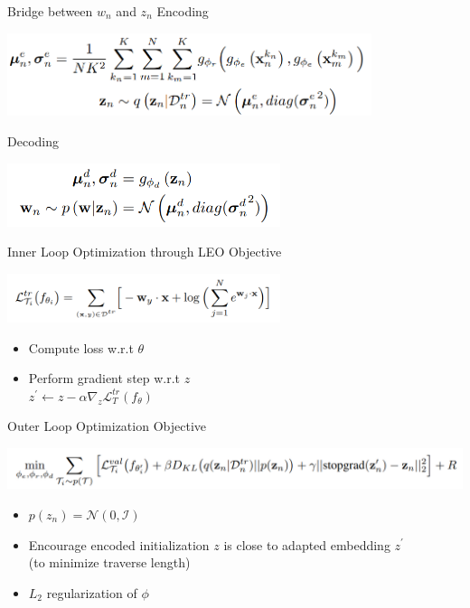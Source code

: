 \documentclass{beamer}
\begin{document}
\begin{frame}{Bridge between $w_n$ and $z_n$}
  Encoding
  \begin{center}
    \includegraphics[width=0.8\textwidth]{fig/LEO-encoding.png}
  \end{center}

  Decoding
  \begin{center}
  \includegraphics[width=0.6\textwidth]{fig/LEO-decoding.png}
  \end{center}
\end{frame}

\begin{frame}{Inner Loop Optimization through LEO}
  Objective
  \begin{center}
  \includegraphics[width=0.6\textwidth]{fig/LEO-inner-obj.png}
  \end{center}

  \begin{itemize}
    \item Compute loss w.r.t $\theta$
    \item Perform gradient step w.r.t $z$ \\
      $z^\prime \leftarrow z - \alpha \nabla_z \mathcal{L}^{tr}_{T}(f_{\theta})$

  \end{itemize}
\end{frame}

\begin{frame}{Outer Loop Optimization}
  Objective

  \center \includegraphics[width=1.0\textwidth]{fig/LEO-outer-obj.png}
  \begin{itemize}
    \item $p(z_n) = \mathcal{N}(0,\mathcal{I})$
    \item Encourage encoded initialization $z$ is close to adapted embedding $z^\prime$ \\
      (to minimize traverse length)
    \item $L_2$ regularization of $\phi$
  \end{itemize}
\end{frame}
\end{document}
